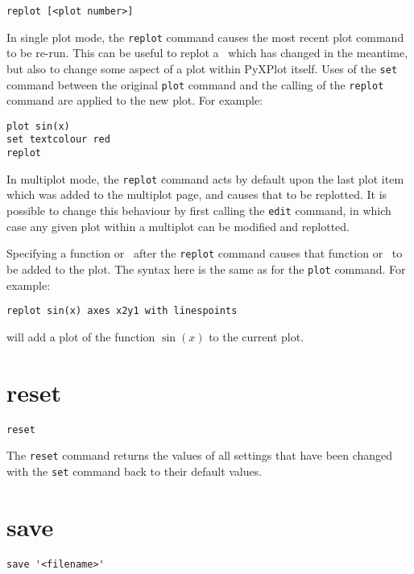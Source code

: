 \begin{verbatim}
replot [<plot number>]
\end{verbatim}

In single plot mode, the {\tt replot} command causes the most recent plot
command to be re-run.  This can be useful to replot a \datafile\ which has changed
in the meantime, but also to change some aspect of a plot within PyXPlot itself.
Uses of the {\tt set} command between the original {\tt plot} command and the
calling of the {\tt replot} command are applied to the new plot. For example:

\begin{verbatim}
plot sin(x)
set textcolour red
replot
\end{verbatim}

In multiplot mode, the {\tt replot} command acts by default upon the last plot
item which was added to the multiplot page, and causes that to be replotted. It
is possible to change this behaviour by first calling the {\tt edit} command, in
which case any given plot within a multiplot can be modified and replotted.

Specifying a function or \datafile\ after the {\tt replot} command causes that
function or \datafile\ to be added to the plot. The syntax here is the same as
for the {\tt plot} command.  For example:

\begin{verbatim}
replot sin(x) axes x2y1 with linespoints
\end{verbatim}

\noindent will add a plot of the function $\sin(x)$ to the current plot.

\section{reset}

\begin{verbatim}
reset
\end{verbatim}

The {\tt reset} command returns the values of all settings that have been
changed with the {\tt set} command back to their default values.


\section{save}

\begin{verbatim}
save '<filename>'
\end{verbatim}

